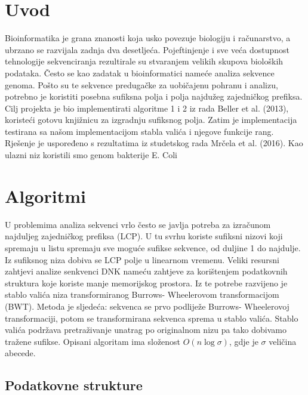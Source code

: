 \documentclass[a4paper,12pt]{article}
\begin{document}
\newpage

\tableofcontents
\newpage

\section{Uvod}

Bioinformatika je grana znanosti koja usko povezuje biologiju i računarstvo, a ubrzano se razvijala zadnja dva desetljeća. Pojeftinjenje i sve veća dostupnost tehnologije sekvenciranja rezultirale su stvaranjem velikih skupova bioloških podataka. Često se kao zadatak u bioinformatici nameće analiza sekvence genoma.
Pošto su te sekvence predugačke za uobičajenu pohranu i analizu, potrebno je koristiti posebna sufiksna polja i polja najdužeg zajedničkog prefiksa. Cilj projekta je bio implementirati algoritme 1 i 2 iz rada Beller et al. (2013), koristeći gotovu knjižnicu za izgradnju sufiksnog polja. 
Zatim je implementacija testirana sa našom implementacijom stabla valića i njegove funkcije rang. Rješenje je uspoređeno s rezultatima iz studetskog rada Mrčela et al. (2016). Kao ulazni niz koristili smo genom bakterije E. Coli

\newpage

\section{Algoritmi}
U problemima analiza sekvenci vrlo često se javlja potreba za izračunom najduljeg zajedničkog prefiksa (LCP). U tu svrhu koriste sufiksni nizovi koji spremaju u listu spremaju sve moguće sufikse sekvence, od duljine 1 do najdulje. Iz sufiksnog niza dobiva se LCP polje u linearnom vremenu. 
Veliki resursni zahtjevi analize senkvenci DNK nameću zahtjeve za korištenjem podatkovnih struktura koje koriste manje memorijskog prostora. Iz te potrebe razvijeno je stablo valića niza transformiranog Burrows- Wheelerovom transformacijom (BWT).
Metoda je sljedeća: sekvenca se prvo podliježe Burrows- Wheelerovoj transformaciji, potom se transformirana sekvenca sprema u stablo valića. Stablo valića podržava pretraživanje unatrag po originalnom nizu pa tako dobivamo tražene sufikse. Opisani algoritam ima složenost $O(n\log\sigma)$, gdje je $\sigma$ veličina abecede.

\subsection{Podatkovne strukture}
\end{document}

